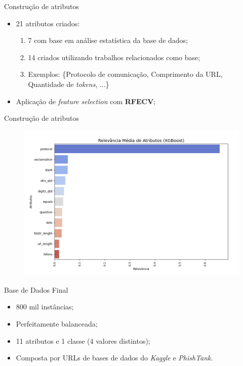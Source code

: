 \documentclass{beamer}
\begin{document}
\begin{frame}{Construção de atributos}
    
    \begin{itemize}
        \setlength{\itemsep}{10pt}
        \item 21 atributos criados:
        \begin{enumerate}
            \vspace{0.2cm}
            \setlength{\itemsep}{10pt}
            \item 7 com base em análise estatística da base de dados;
            \item 14 criados utilizando trabalhos relacionados como base;
            \item Exemplos: \{Protocolo de comunicação, Comprimento da URL, Quantidade de \emph{tokens}, ...\}
        \end{enumerate}
        \item Aplicação de \emph{feature selection} com \textbf{RFECV};
    \end{itemize}
    
\end{frame}

\begin{frame}{Construção de atributos}
    
    \begin{figure}
        \centering
        \includegraphics[width=1\textwidth]{pic/attr.png}
        \label{fig:map2}
    \end{figure}
    
\end{frame}

\begin{frame}{Base de Dados Final}
    
    \begin{itemize}
        \setlength{\itemsep}{10pt}
        \item 800 mil instâncias;
        \item Perfeitamente balanceada;
        \item 11 atributos e 1 classe (4 valores distintos);
        \item Composta por URLs de bases de dados do \emph{Kaggle} e \emph{PhishTank}.
    \end{itemize}
    
\end{frame}
\end{document}
